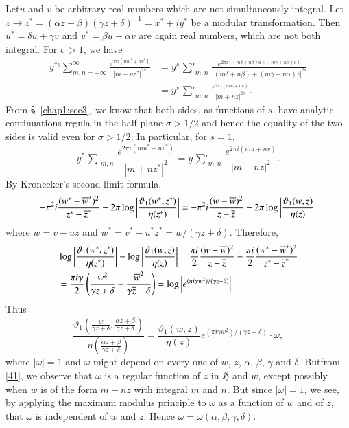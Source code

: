 Let\pageoriginale $u$ and $v$ be arbitrary real numbers which are not
simultaneously integral. Let $z\to z^{\ast}=(\alpha z+\beta)(\gamma
z+\delta)^{-1}=x^{\ast}+iy^{\ast}$ be a modular transformation. Then
$u^{\ast}=\delta u+\gamma v$ and $v^{\ast}=\beta u+\alpha v$ are again
real numbers, which are not both integral. For $\sigma>1$, we have
\begin{align*}
y^{\ast s}\sum^{\infty}_{m,n=-\infty}\frac{e^{2\pi
    i(mu^{\ast}+nv^{\ast})}}{|m+nz^{\ast}|^{2s}} &=
  y^{s}\mathop{{\sum}'}_{m,n}\frac{e^{2\pi
      i((m\delta+n\beta)u+(m\gamma+n\alpha)v)}}{|(m\delta+n\beta)+(m\gamma+n\alpha)z|^{2s}}\\
&= y^{s}\mathop{{\sum}'}_{m,n}\frac{e^{2\pi i(mu+nv)}}{|m+nz|^{2s}}.
\end{align*}
From \S\ \ref{chap1:sec3}, we know that both sides, as functions of $s$,
have analytic continuations regula in the half-plane $\sigma>1/2$ and
hence the equality of the two sides is valid even for $\sigma>1/2$. In
particular, for $s=1$,
\begin{equation*}
y^{\ast}\mathop{{\sum}'}_{m,n}\frac{e^{2\pi
    i(mu^{\ast}+nv^{\ast})}}{|m+nz^{\ast}|^{2}}=y\mathop{{\sum}'}_{m,n}\frac{e^{2\pi
    i(mu+nv)}}{|m+nz|^{2}}.\tag{40}\label{40}
\end{equation*}
By Kronecker's second limit formula,
$$
-\pi^{2}i\frac{(w^{\ast}-\overline{w}^{\ast})^{2}}{z^{\ast}-\overline{z}^{\ast}}-2\pi\log
\left|\frac{\vartheta_{1}(w^{\ast},z^{\ast})}{\eta(z^{\ast})}\right|=-\pi^2
i\frac{(w-\overline{w})^{2}}{z-\overline{z}}-2\pi 
\log\left|\frac{\vartheta_{1}(w,z)}{\eta(z)}\right| 
$$
where $w=v-uz$ and $w^{\ast}=v^{\ast}-u^{\ast}z^{\ast}=w/(\gamma
z+\delta)$. Therefore,
\begin{align*}
&
  \log\left|\frac{\vartheta_{1}(w^{\ast},
z^{\ast})}{\eta(z^{\ast})}\right| -
  \log\left|\frac{\vartheta_{1}(w,z)}{\eta(z)}\right|  
  =\frac{\pi 
  i}{2}\frac{(w - \overline{w})^{2}}{z-\overline{z}}-\frac{\pi
  i}{2}\frac{(w^{\ast}-\overline{w}^{\ast})^{2}}{z^{\ast}-\overline{z}^{\ast}}\\
&=\frac{\pi i\gamma}{2}\left(\frac{w^{2}}{\gamma
    z+\delta}-\frac{\overline{w}^{2}}{\gamma\overline{z}+\delta}\right)=\log\left|e^{(\pi
    i\gamma w^{2})/(\gamma z+\delta)}\right|  
\end{align*}
Thus
\begin{equation*}
\frac{\vartheta_{1}\left(\frac{w}{\gamma z+\delta}, \frac{\alpha
    z+\beta}{\gamma z+\delta}\right)}{\eta\left(\frac{\alpha
    z+\beta}{\gamma
    z+\delta}\right)}=\frac{\vartheta_{1}(w,z)}{\eta(z)}e^{(\pi
  i\gamma w^{2})/(\gamma z+\delta)}\cdot \omega,\tag{41}\label{41}
\end{equation*}
where $|\omega|=1$ and $\omega$ might depend on every one of $w$, $z$,
$\alpha$, $\beta$, $\gamma$ and $\delta$. But\pageoriginale from
\eqref{41}, we observe that $\omega$ is a regular function of $z$ in
$\mathfrak{H}$ and $w$, except possibly when $w$ is of the form $m+nz$
with integral $m$ and $n$. But since $|\omega|=1$, we see, by applying
the maximum modulus principle to $\omega$ as a function of $w$ and of
$z$, that $\omega$ is independent of $w$ and $z$. Hence
$\omega=\omega(\alpha,\beta,\gamma,\delta)$. 

